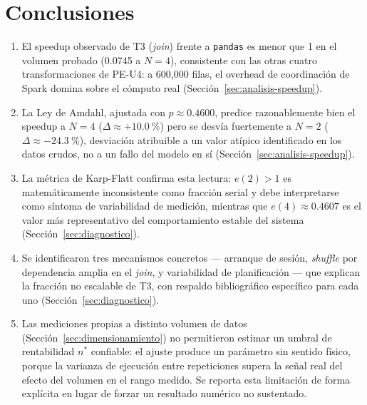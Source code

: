 \documentclass[11pt,a4paper]{article}
\begin{document}

    \section{Conclusiones}
    \label{sec:conclusiones}

    \begin{enumerate}
        \item El speedup observado de T3 (\emph{join}) frente a
        \texttt{pandas} es menor que 1 en el volumen probado (0.0745 a
        $N=4$), consistente con las otras cuatro transformaciones de
        PE-U4: a 600{,}000 filas, el overhead de coordinación de Spark
        domina sobre el cómputo real (Sección~\ref{sec:analisis-speedup}).

        \item La Ley de Amdahl, ajustada con $p \approx 0.4600$, predice
        razonablemente bien el speedup a $N=4$ ($\Delta \approx +10.0\ \si{\percent}$)
        pero se desvía fuertemente a $N=2$ ($\Delta \approx -24.3\ \si{\percent}$),
        desviación atribuible a un valor atípico identificado en los datos
        crudos, no a un fallo del modelo en sí
        (Sección~\ref{sec:analisis-speedup}).

        \item La métrica de Karp-Flatt confirma esta lectura: $e(2) >
        1$ es matemáticamente inconsistente como fracción serial y debe
        interpretarse como síntoma de variabilidad de medición, mientras
        que $e(4) \approx 0.4607$ es el valor más representativo del
        comportamiento estable del sistema (Sección~\ref{sec:diagnostico}).

        \item Se identificaron tres mecanismos concretos --- arranque de
        sesión, \emph{shuffle} por dependencia amplia en el \emph{join}, y
        variabilidad de planificación --- que explican la fracción no
        escalable de T3, con respaldo bibliográfico específico para cada
        uno (Sección~\ref{sec:diagnostico}).

        \item Las mediciones propias a distinto volumen de datos
        (Sección~\ref{sec:dimensionamiento}) no permitieron estimar un
        umbral de rentabilidad $n^{*}$ confiable: el ajuste produce un
        parámetro sin sentido físico, porque la varianza de ejecución
        entre repeticiones supera la señal real del efecto del volumen en
        el rango medido. Se reporta esta limitación de forma explícita en
        lugar de forzar un resultado numérico no sustentado.


\end{enumerate}
\end{document}
